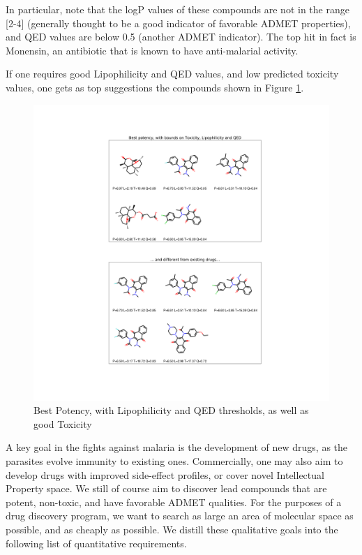 \documentclass[journal=jacsat,manuscript=article]{achemso}
\begin{document}
In particular, note that the logP values of these compounds are not in the range [2-4] (generally thought to be a good indicator of favorable ADMET properties), and QED values are below 0.5 (another ADMET indicator).
The top hit in fact is Monensin, an antibiotic that is known to have anti-malarial activity\cite{Ludwig2019}.

If one requires good Lipophilicity and QED values, and low predicted toxicity values, one gets as top suggestions the compounds shown in Figure \ref{fig:best_q}.


\begin{figure}[h!]
\centering
\includegraphics[width=\textwidth]{fig7.png}
\caption{Best Potency, with Lipophilicity and QED thresholds, as well as good Toxicity}
\label{fig:best_q}
\end{figure}


A key goal in the fights against malaria is the development of new drugs, as the parasites evolve immunity to existing ones.  Commercially, one may also aim to develop drugs with improved  side-effect profiles, or cover novel Intellectual Property space.  We still of course aim to discover lead compounds that are potent, non-toxic, and have favorable ADMET qualities.  For the purposes of a drug discovery program, we want to search as large an area of molecular space as possible, and as cheaply as possible. We distill these qualitative goals into the following list of quantitative requirements. 
\end{document}
